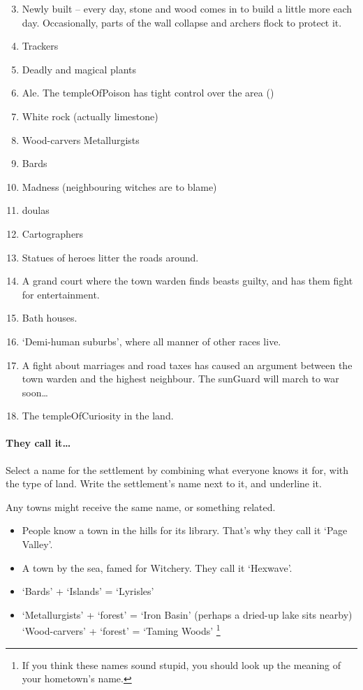 \begin{multicols}{2}
\begin{enumerate}
\setcounter{enumi}{2}
  \item
  Newly built -- every day, stone and wood comes in to build a little more each day.
  Occasionally, parts of the wall collapse and archers flock to protect it.
  \item
  Trackers
  \item
  Deadly and magical plants
  \item
  Ale.
  The \gls{templeOfPoison} has tight control over the area ()
  \item
  White rock (actually limestone)
  \item
  \ifodd\value{r4}
    Wood-carvers
  \else
    Metallurgists
  \fi
  \item
  Bards
  \item
  Madness (neighbouring witches are to blame)
  \item
  \Glspl{doula}
  \item
  Cartographers
  \item
  Statues of heroes litter the roads around.
  \item
  A grand \gls{court} where the town \gls{warden} finds beasts guilty, and has them fight for entertainment.
  \item
  Bath houses.
  \item
  `Demi-human suburbs', where all manner of other races live.
  \item
  A fight about marriages and road taxes has caused an argument between the town \gls{warden} and the highest neighbour.
  The \gls{sunGuard} will march to war soon\ldots
  \item
  The \gls{templeOfCuriosity} in the land.
\end{enumerate}

\paragraph{They call it\ldots{}}

Select a name for the settlement by combining what everyone knows it for, with the type of land.
Write the settlement's name next to it, and underline it.

Any towns might receive the same name, or something related.

\begin{itemize}
  \item
  People know a town in the hills for its library. That's why they call
  it `Page Valley'.
  \item
  A town by the sea, famed for Witchery.
  They call it `Hexwave'.
  \item
  `Bards' + `Islands' = `Lyrisles'
  \item
  \ifodd\value{r4}
    `Metallurgists' + `forest' = `Iron Basin' (perhaps a dried-up lake sits nearby)
  \else
    `Wood-carvers' + `forest' = `Taming Woods'%
  \fi
  \footnote{If you think these names sound stupid, you should look up the meaning of your hometown's name.}
\end{itemize}


\end{multicols}
